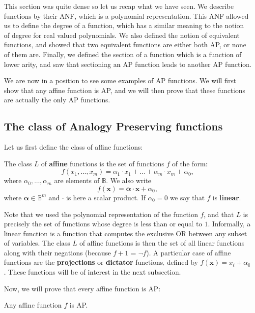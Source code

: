 This section was quite dense so let us recap what we have seen. We
describe functions by their ANF, which is a polynomial representation. This ANF
allowed us to define the degree of a function, which has a similar meaning to
the notion of degree for real valued polynomials. We also defined the notion of
equivalent functions, and showed that two equivalent functions are either both
AP, or none of them are. Finally, we defined the section of a function which is
a function of lower arity, and saw that sectioning an AP function leads to
another AP function.

We are now in a position to see some examples of AP functions. We will first
show that any affine function is AP, and we will then prove that these
functions are actually the only AP functions.

\subsection{The class of Analogy Preserving functions}
\label{SEC:the_class_of_AP_functions}

Let us first define the class of affine functions:
\begin{definition}
  The class $L$ of \textbf{affine} functions is the set of functions $f$ of the
  form:
  $$f(x_1,\ldots , x_m)=\alpha_1\cdot x_1+\ldots +\alpha_m\cdot
  x_m+\alpha_0,$$
  where $\alpha_0,\ldots, \alpha_m$ are elements of $\mathbb{B}$. We also write
  $$f(\mathbf{x}) = \boldsymbol{\alpha} \cdot \mathbf{x} + \alpha_0,$$
  where $\boldsymbol{\alpha} \in \mathbb{B}^m$ and $\cdot$ is here a scalar
  product.  If $\alpha_0= 0$ we say that $f$ is \textbf{linear}.
\end{definition}

Note that we used the polynomial representation of the function $f$, and that
$L$ is precisely the set of functions whose degree is less than or equal to
$1$. Informally, a linear function is a function that computes the exclusive OR
between any subset of variables. The class $L$ of affine functions is then the set of all linear
functions along with their negations (because $f + 1$ = $\neg f$). A particular
case of affine functions are the \textbf{projections} or \textbf{dictator}
functions, defined by $f(\mathbf{x}) = x_i + \alpha_0$. These functions will be
of interest in the next subsection.

Now, we will prove that every affine function is AP:
\begin{proposition}
  \label{PROPOS:affine_functions_are_ap}
  Any affine function $f$ is AP.
\end{proposition}

